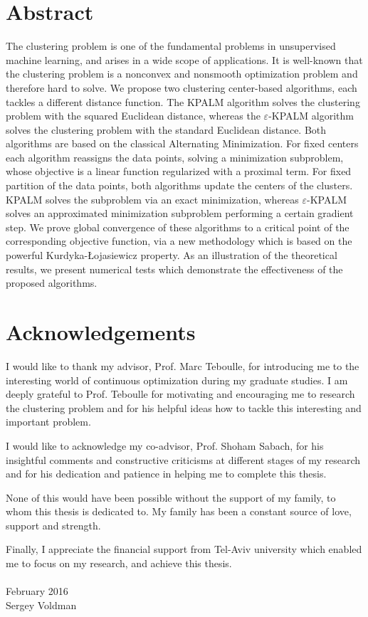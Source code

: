 \setcounter{page}{2}
\chapter*{Abstract}

The clustering problem is one of the fundamental problems in unsupervised machine learning, and arises in a wide scope of applications. It is well-known that the clustering problem is a nonconvex and nonsmooth optimization problem and therefore hard to solve. 
We propose two clustering center-based algorithms, each tackles a different distance function. The KPALM algorithm solves the clustering problem with the squared Euclidean distance, whereas the $\varepsilon$-KPALM algorithm solves the clustering problem with the standard Euclidean distance. 
Both algorithms are based on the classical Alternating Minimization. For fixed centers each algorithm reassigns the data points, solving a minimization subproblem, whose objective is a linear function regularized with a proximal term. For fixed partition of the data points, both algorithms update the centers of the clusters. KPALM solves the subproblem via an exact minimization, whereas $\varepsilon$-KPALM solves an approximated minimization subproblem performing a certain gradient step.
We prove global convergence of these algorithms to a critical point of the corresponding objective function, via a new methodology which is based on the powerful Kurdyka-{\L}ojasiewicz property. 
As an illustration of the theoretical results, we present numerical tests which demonstrate the effectiveness of the proposed algorithms.



\chapter*{Acknowledgements}

I would like to thank my advisor, Prof. Marc Teboulle, for introducing me to the interesting world of continuous optimization during my graduate studies. I am deeply grateful to Prof. Teboulle for motivating and encouraging me to research the clustering problem and for his helpful ideas how to tackle this interesting and important problem.

I would like to acknowledge my co-advisor, Prof. Shoham Sabach, for his insightful comments and constructive criticisms at different stages of my research and for his dedication and patience in helping me to complete this thesis.

None of this would have been possible without the support of my family, to whom this thesis is dedicated to. My family has been a constant source of love, support and strength.

Finally, I appreciate the financial support from Tel-Aviv university which enabled me to focus on my research, and achieve this thesis.
\\
\\
\noindent February 2016\\
\noindent Sergey Voldman



\nobreak
